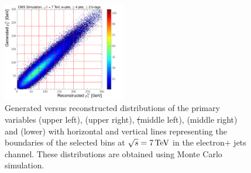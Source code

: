 \begin{figure}[hbtp]
	 \includegraphics[width=0.48\textwidth]{Chapters/04_Analysis/04b_XSections/images/binning/electron_WPT_7TeV.pdf}\hfill
	 \caption{Generated versus reconstructed distributions of the primary variables \met (upper left), \HT (upper
	 right), \st (middle left), \mt (middle right) and \wpt (lower) with horizontal and vertical lines
	 representing the boundaries of the selected bins at $\sqrt{s}=7\,\text{Te\hspace{-.08em}V}$ in the electron+ jets channel. These
	 distributions are obtained using \ttbar Monte Carlo simulation.}
     \label{fig:binning_7TeV_electron}
\end{figure}

